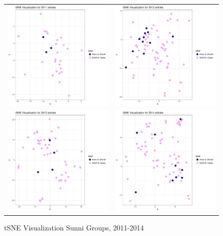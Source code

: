 \begin{center}
\begin{figure}
  \begin{tabular}{cc}
    \includegraphics[width=.45\columnwidth]{./Pictures/2011sunnis_testData_tSNEDimRed.pdf}&
    \includegraphics[width=.45\columnwidth]{./Pictures/2012sunnis_testData_tSNEDimRed.pdf}\\
    \includegraphics[width=.45\columnwidth]{./Pictures/2013sunnis_testData_tSNEDimRed.pdf}&
    \includegraphics[width=.45\columnwidth]{./Pictures/2014sunnis_testData_tSNEDimRed.pdf}\\
  \end{tabular}
  \caption{tSNE Visualization Sunni Groups, 2011-2014}
  \label{fig:tsne-sunnis}
\end{figure}
\end{center}

